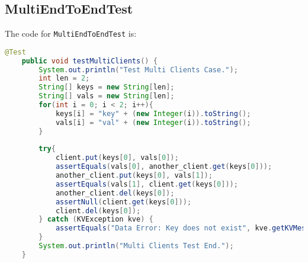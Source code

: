 \documentclass{article}
\begin{document}
\subsection{MultiEndToEndTest}
The code for \texttt{MultiEndToEndTest} is:
\begin{lstlisting}[language=java]
	@Test
    public void testMultiClients() {
    	System.out.println("Test Multi Clients Case.");
    	int len = 2;
    	String[] keys = new String[len];
    	String[] vals = new String[len];
    	for(int i = 0; i < 2; i++){
    		keys[i] = "key" + (new Integer(i)).toString();
    		vals[i] = "val" + (new Integer(i)).toString();
    	}
    	
    	try{
    		client.put(keys[0], vals[0]);
    		assertEquals(vals[0], another_client.get(keys[0]));
    		another_client.put(keys[0], vals[1]);
    		assertEquals(vals[1], client.get(keys[0]));
    		another_client.del(keys[0]);
    		assertNull(client.get(keys[0]));
    		client.del(keys[0]);
    	} catch (KVException kve) {
    		assertEquals("Data Error: Key does not exist", kve.getKVMessage().getMessage());
    	}
    	System.out.println("Multi Clients Test End.");
    }
\end{lstlisting}
\end{document}
